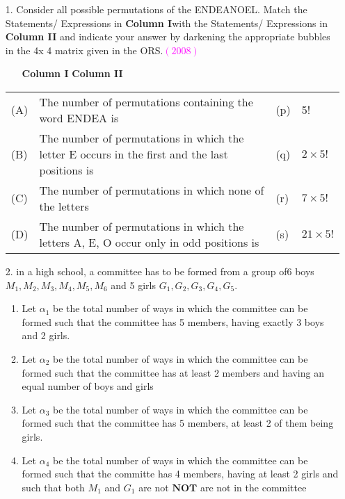 \documentclass[journal,12pt,twocolumn]{IEEEtran}
\theoremstyle{remark}
\begin{document}
\begin{enumerate}
    \item[1. \hspace{0.5cm}] Consider all possible permutations of the ENDEANOEL. Match the Statements/ Expressions in
\textbf{Column I}with the Statements/ Expressions in \textbf{Column II} and indicate your answer by darkening
the appropriate bubbles in the 4x 4 matrix given in the ORS.\hfill\textcolor{magenta}{$(2008)$}\\ \begin{enumerate}
    \item[] \textbf{Column I} \hspace{10cm} \textbf{Column II}
    \vspace{0.8cm}
\end{enumerate}
\begin{tabular}{p{0.5cm}p{9cm}p{2.5cm}p{2cm}}
 (A) & The number of permutations containing the word ENDEA is & \hspace{2cm}(p) & 5! \\
    (B) & The number of permutations in which the letter E occurs in the first and the last positions is & \hspace{2cm}(q) & $2\times{5!}$\\
    (C)& The number of permutations in which none of the letters & \hspace{2cm}(r) &$7\times{5!}$\\
    (D) & The number of permutations in which the letters A, E, O occur only in odd positions is & \hspace{2cm}(s) & $21\times{5!}$
    
\end{tabular}
\vspace{0.5cm}
\item[2.\hspace{0.5cm}] in a high school, a committee has to be formed from a group of6 boys $M_1,M_2,M_3,M_4,M_5,M_6$ and 5 girls $G_1,G_2,G_3,G_4,G_5$.
\begin{enumerate}
    \item Let $\alpha_1$ be the total number of ways in which the committee can be formed such that the committee has 5 members, having exactly 3 boys and 2 girls. 
    \item Let $\alpha_2$ be the total number of ways in which the committee can be formed such that the committee has at least 2 members and having an equal number of boys and girls
    \item Let $\alpha_3$ be the total number of ways in which the committee can be formed such that the committee has 5 members, at least 2 of them being girls. 
    \item Let $\alpha_4$ be the total number of ways in which the committee can be formed such that the committe has 4 members, having at least 2 girls and such that both $M_1$ and $G_1$ are not $\mathbf{NOT} $ are not in the committee
\end{enumerate}



    
\end{enumerate}
\end{document}
